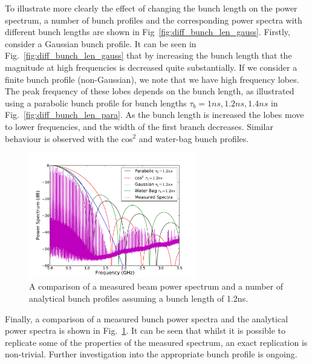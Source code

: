 To illustrate more clearly the effect of changing the bunch length on the power spectrum, a number of bunch profiles and the corresponding power spectra with different bunch lengths are shown in Fig~\ref{fig:diff_bunch_len_gauss}. Firstly, consider a Gaussian bunch profile. It can be seen in Fig.~\ref{fig:diff_bunch_len_gauss} that by increasing the bunch length that the magnitude at high frequencies is decreased quite substantially. If we consider a finite bunch profile (non-Gaussian), we note that we have high frequency lobes. The peak frequency of these lobes depends on the bunch length, as illustrated using a parabolic bunch profile for bunch lengths $\tau_{b} = 1ns, 1.2ns, 1.4ns$ in Fig.~\ref{fig:diff_bunch_len_para}. As the bunch length is increased the lobes move to lower frequencies, and the width of the first branch decreases. Similar behaviour is observed with the cos$^{2}$ and water-bag bunch profiles.

\begin{figure}
\begin{center}
\includegraphics[width=0.65\textwidth]{Wakefields_and_Impedances/figures/beam_spectra_power_12ns.pdf}
\end{center}
\caption{A comparison of a measured beam power spectrum and a number of analytical bunch profiles assuming a bunch length of 1.2ns.}
\label{fig:power_all}
\end{figure}

Finally, a comparison of a measured bunch power spectra and the analytical power spectra is shown in Fig.~\ref{fig:power_all}. It can be seen that whilst it is possible to replicate some of the properties of the measured spectrum, an exact replication is non-trivial. Further investigation into the appropriate bunch profile is ongoing.




